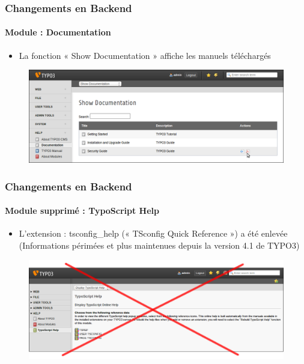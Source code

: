 \begin{frame}[fragile]
	\frametitle{Changements en Backend}
	\framesubtitle{Module : Documentation}

	\begin{itemize}
		\item La fonction « Show Documentation » affiche les manuels téléchargés
	\end{itemize}

	\begin{figure}
		\includegraphics[width=0.95\linewidth]{Images/BackendChanges/ShowDocumentation.png}
	\end{figure}

\end{frame}


\begin{frame}[fragile]
	\frametitle{Changements en Backend}
	\framesubtitle{Module supprimé : TypoScript Help}

 	\begin{itemize}
		\item L'extension : tsconfig\_help (« TSconfig Quick Reference ») a été enlevée\newline
		\small(Informations périmées et plus maintenues depuis la version 4.1 de TYPO3)
	\end{itemize}

	\begin{figure}
		\includegraphics[width=0.95\linewidth]{Images/BackendChanges/TypoScriptHelpRemovedCrossed.png}
	\end{figure}

\end{frame}


